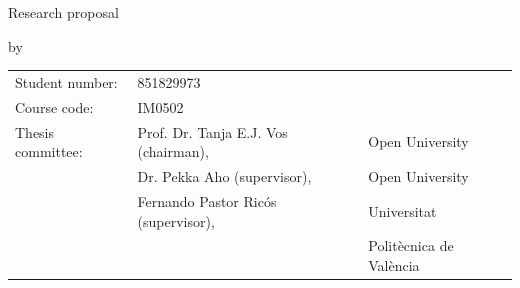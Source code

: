 
\pagestyle{plain}
\begin{titlepage}
    \begin{center}
    
        
        \vspace*{2\bigskipamount}
        
        {\color{red}\Huge\bf \thetitle}
        \bigskip
        
        {\large Research proposal}
        
        \bigskip \bigskip
        by
        \bigskip \bigskip
        
        {\Large\bf \theauthor}
        
        \bigskip \bigskip\bigskip \bigskip
        
        \begin{tabular}{lll}
            Student number: & 851829973 \\
            Course code: & \textsc{IM}0502\\
            Thesis committee:
                & Prof. Dr. Tanja E.J. Vos (chairman), & Open University \\
                & Dr. Pekka Aho (supervisor), & Open University \\
                & Fernando Pastor Ricós (supervisor), & Universitat \\
                &  & Politècnica de València
        \end{tabular}
    
    \end{center}
\end{titlepage}


\let\cleardoublepage\clearpage